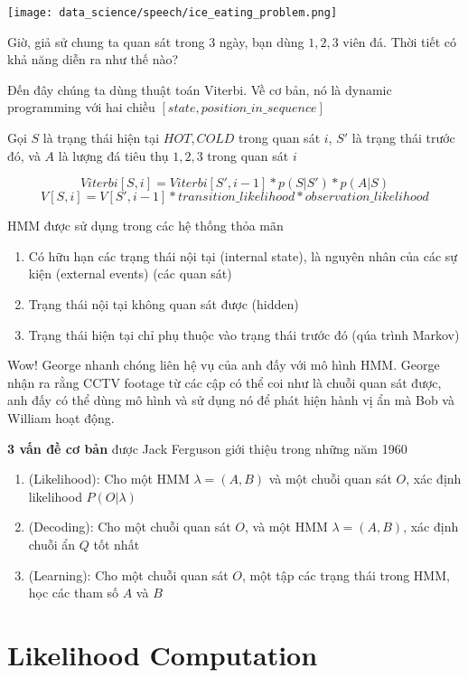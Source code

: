 \texttt{[image: data\_science/speech/ice\_eating\_problem.png]}

Giờ, giả sử chung ta quan sát trong 3 ngày, bạn dùng $1, 2, 3$ viên đá. Thời tiết có khả năng diễn ra như thế nào?

Đến đây chúng ta dùng thuật toán Viterbi. Về cơ bản, nó là dynamic programming với hai chiều $[state, position\_in\_sequence]$

Gọi $S$ là trạng thái hiện tại ${HOT, COLD}$ trong quan sát $i$, $S'$ là trạng thái trước đó, và $A$ là lượng đá tiêu thụ ${1, 2, 3}$ trong quan sát $i$

$$Viterbi[S,i] = Viterbi[S', i-1] * p(S|S') * p(A|S)$$
$$V[S,i] = V[S',i-1] * transition\_likelihood * observation\_likelihood$$

HMM được sử dụng trong các hệ thống thỏa mãn

\begin{enumerate}
  \item Có hữu hạn các trạng thái nội tại (internal state), là nguyên nhân của các sự kiện (external events) (các quan sát)
  \item Trạng thái nội tại không quan sát được (hidden)
  \item Trạng thái hiện tại chỉ phụ thuộc vào trạng thái trước đó (qúa trình Markov)
\end{enumerate}

Wow! George nhanh chóng liên hệ vụ của anh đấy với mô hình HMM. George nhận ra rằng CCTV footage từ các cập có thể coi như là chuỗi quan sát được, anh đấy có thể dùng mô hình và sử dụng nó để phát hiện hành vị ẩn mà Bob và William hoạt động.

\textbf{3 vấn đề cơ bản} được Jack Ferguson giới thiệu trong những năm 1960

\begin{enumerate}
  \item (Likelihood): Cho một HMM $\lambda = (A, B)$ và một chuỗi quan sát $O$, xác định likelihood $P(O|\lambda)$
  \item (Decoding): Cho một chuỗi quan sát $O$, và một HMM $\lambda = (A,B)$, xác định chuỗi ẩn $Q$ tốt nhất
  \item (Learning): Cho một chuỗi quan sát $O$, một tập các trạng thái trong HMM, học các tham số $A$ và $B$
\end{enumerate}

\section{Likelihood Computation}

